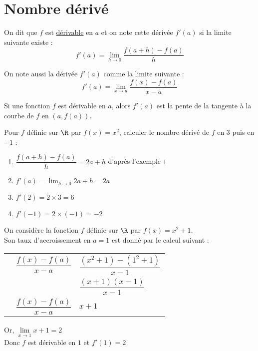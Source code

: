 \documentclass[12pt]{article}
\begin{document}
\section{Nombre dérivé} %

\begin{definition}
   On dit que $f$ est \underline{dérivable} en $a$ et on note cette dérivée $f'(a)$ si la limite suivante existe :
$$f'(a)=\lim_{h\to0}\frac{f(a+h)-f(a)}{h}$$
\end{definition}

\begin{remarque}
   On note aussi la dérivée $f'(a)$ comme la limite suivante :
$$f'(a)=\lim_{x\to a}\frac{f(x)-f(a)}{x-a}$$
\end{remarque}

\begin{propriete}
  Si une fonction $f$ est dérivable en $a$, alors $f'(a)$ est la pente de la
  tangente à la courbe de $f$ en $(a, f(a))$.
\end{propriete}

\begin{exemple}
  Pour $f$ définie sur $\R$ par $f(x)=x^2$, calculer le nombre dérivé de $f$ en $3$ puis en $-1$ :
   \begin{enumerate}
      \item $\dfrac{f(a+h)-f(a)}{h}=2a+h$ d'après l'exemple $1$
      \item $f'(a)=\lim_{h\to0}2a+h=2a $
      \item $f'(2)=2\times 3=6$
      \item $f'(-1)=2\times (-1)=-2$
   \end{enumerate}
\end{exemple}

\begin{exemple}
On considère la fonction $f$ définie sur $\R$ par $f(x)=x^2+1$.\\
Son taux d'accroissement en $a=1$ est donné par le calcul suivant :
\begin{center}
  \begin{tabular}{p{0.3cm}l!{=}l}
    &  $\dfrac{f(x)-f(a)}{x-a}$ & $\dfrac{(x^2+1)-(1^2+1)}{x-1}$ \\
    & & $\dfrac{(x+1)(x-1)}{x-1}$ \\
    &   $\dfrac{f(x)-f(a)}{x-a}$ & $x+1$ \\
  \end{tabular}
\end{center}
Or, $\lim\limits_{x\to1}x+1=2$\\
Donc $f$ est dérivable en $1$ et $f'(1)=2$
\end{exemple}
\end{document}
